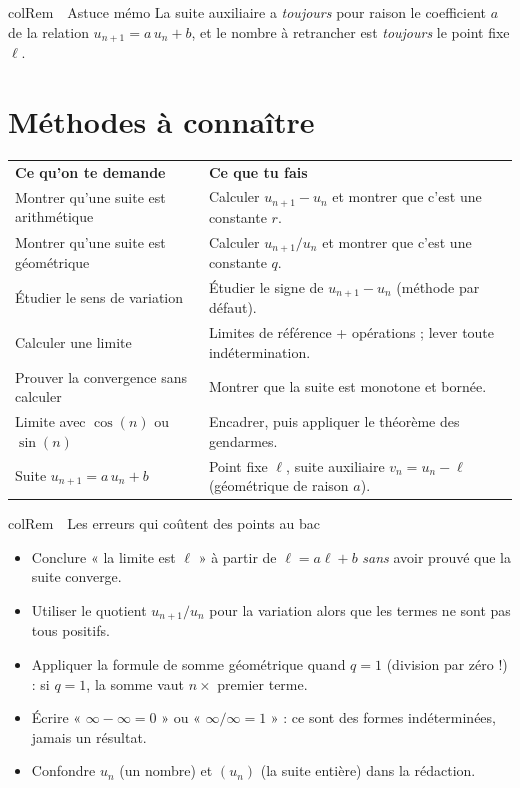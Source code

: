 \documentclass[11pt,a4paper]{article}
\newenvironment{remarque}[1][Remarque]
  {\begin{fiche}{colRem}{\ding{43}~~#1}}{\end{fiche}}
\begin{document}
\begin{remarque}[Astuce mémo]
La suite auxiliaire a \emph{toujours} pour raison le coefficient $a$ de la relation $u_{n+1} = a\,u_n + b$, et le nombre à retrancher est \emph{toujours} le point fixe $\ell$.
\end{remarque}

\section{Méthodes à connaître}

\begin{center}
\renewcommand{\arraystretch}{1.45}
\sffamily\small
\begin{tabular}{>{\raggedright\arraybackslash}p{6.6cm} >{\raggedright\arraybackslash}p{9.4cm}}
\rowcolor{qtealdark} \color{white}\bfseries Ce qu'on te demande & \color{white}\bfseries Ce que tu fais \\
\rowcolor{tealpale} Montrer qu'une suite est arithmétique & Calculer $u_{n+1} - u_n$ et montrer que c'est une constante $r$. \\
Montrer qu'une suite est géométrique & Calculer $u_{n+1}/u_n$ et montrer que c'est une constante $q$. \\
\rowcolor{tealpale} Étudier le sens de variation & Étudier le signe de $u_{n+1} - u_n$ (méthode par défaut). \\
Calculer une limite & Limites de référence + opérations ; lever toute indétermination. \\
\rowcolor{tealpale} Prouver la convergence sans calculer & Montrer que la suite est monotone et bornée. \\
Limite avec $\cos(n)$ ou $\sin(n)$ & Encadrer, puis appliquer le théorème des gendarmes. \\
\rowcolor{tealpale} Suite $u_{n+1} = a\,u_n + b$ & Point fixe $\ell$, suite auxiliaire $v_n = u_n - \ell$ (géométrique de raison $a$). \\
\end{tabular}
\end{center}

\begin{remarque}[Les erreurs qui coûtent des points au bac]
\begin{itemize}[leftmargin=6mm, itemsep=0.5mm]
  \item Conclure « la limite est $\ell$ » à partir de $\ell = a\ell + b$ \emph{sans} avoir prouvé que la suite converge.
  \item Utiliser le quotient $u_{n+1}/u_n$ pour la variation alors que les termes ne sont pas tous positifs.
  \item Appliquer la formule de somme géométrique quand $q = 1$ (division par zéro !) : si $q = 1$, la somme vaut $n \times$ premier terme.
  \item Écrire « $\infty - \infty = 0$ » ou « $\infty/\infty = 1$ » : ce sont des formes indéterminées, jamais un résultat.
  \item Confondre $u_n$ (un nombre) et $(u_n)$ (la suite entière) dans la rédaction.
\end{itemize}
\end{remarque}
\end{document}
